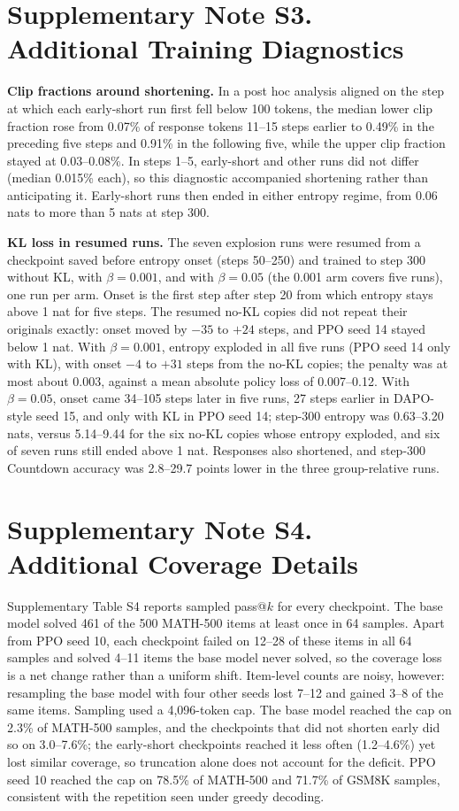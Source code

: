 \documentclass[11pt]{article}
\begin{document}
\section*{Supplementary Note S3. Additional Training Diagnostics}
\noindent\textbf{Clip fractions around shortening.} In a post hoc analysis aligned on the step at which each early-short run first fell below 100 tokens, the median lower clip fraction rose from 0.07\% of response tokens 11--15 steps earlier to 0.49\% in the preceding five steps and 0.91\% in the following five, while the upper clip fraction stayed at 0.03--0.08\%. In steps 1--5, early-short and other runs did not differ (median 0.015\% each), so this diagnostic accompanied shortening rather than anticipating it. Early-short runs then ended in either entropy regime, from 0.06 nats to more than 5 nats at step 300.

\noindent\textbf{KL loss in resumed runs.} The seven explosion runs were resumed from a checkpoint saved before entropy onset (steps 50--250) and trained to step 300 without KL, with $\beta=0.001$, and with $\beta=0.05$ (the 0.001 arm covers five runs), one run per arm. Onset is the first step after step 20 from which entropy stays above 1 nat for five steps. The resumed no-KL copies did not repeat their originals exactly: onset moved by $-35$ to $+24$ steps, and PPO seed 14 stayed below 1 nat. With $\beta=0.001$, entropy exploded in all five runs (PPO seed 14 only with KL), with onset $-4$ to $+31$ steps from the no-KL copies; the penalty was at most about 0.003, against a mean absolute policy loss of 0.007--0.12. With $\beta=0.05$, onset came 34--105 steps later in five runs, 27 steps earlier in DAPO-style seed 15, and only with KL in PPO seed 14; step-300 entropy was 0.63--3.20 nats, versus 5.14--9.44 for the six no-KL copies whose entropy exploded, and six of seven runs still ended above 1 nat. Responses also shortened, and step-300 Countdown accuracy was 2.8--29.7 points lower in the three group-relative runs.

\section*{Supplementary Note S4. Additional Coverage Details}
Supplementary Table S4 reports sampled pass@$k$ for every checkpoint. The base model solved 461 of the 500 MATH-500 items at least once in 64 samples. Apart from PPO seed 10, each checkpoint failed on 12--28 of these items in all 64 samples and solved 4--11 items the base model never solved, so the coverage loss is a net change rather than a uniform shift. Item-level counts are noisy, however: resampling the base model with four other seeds lost 7--12 and gained 3--8 of the same items. Sampling used a 4,096-token cap. The base model reached the cap on 2.3\% of MATH-500 samples, and the checkpoints that did not shorten early did so on 3.0--7.6\%; the early-short checkpoints reached it less often (1.2--4.6\%) yet lost similar coverage, so truncation alone does not account for the deficit. PPO seed 10 reached the cap on 78.5\% of MATH-500 and 71.7\% of GSM8K samples, consistent with the repetition seen under greedy decoding.
\end{document}
